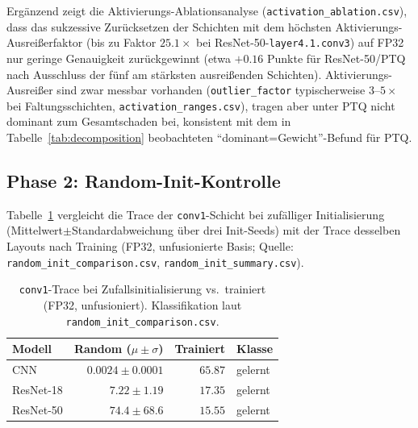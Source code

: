 Ergänzend zeigt die Aktivierungs-Ablationsanalyse (\texttt{activation\_ablation.csv}), dass das sukzessive Zurücksetzen der Schichten mit dem höchsten Aktivierungs-Ausreißerfaktor (bis zu Faktor $25.1\times$ bei ResNet-50-\texttt{layer4.1.conv3}) auf FP32 nur geringe Genauigkeit zurückgewinnt (etwa $+0.16$ Punkte für ResNet-50/PTQ nach Ausschluss der fünf am stärksten ausreißenden Schichten). Aktivierungs-Ausreißer sind zwar messbar vorhanden (\texttt{outlier\_factor} typischerweise $3$--$5\times$ bei Faltungsschichten, \texttt{activation\_ranges.csv}), tragen aber unter PTQ nicht dominant zum Gesamtschaden bei, konsistent mit dem in Tabelle~\ref{tab:decomposition} beobachteten \enquote{dominant=Gewicht}-Befund für PTQ.

\subsection{Phase 2: Random-Init-Kontrolle}
\label{sec:phase2}

Tabelle~\ref{tab:randominit} vergleicht die Trace der \texttt{conv1}-Schicht bei zufälliger Initialisierung (Mittelwert$\pm$Standardabweichung über drei Init-Seeds) mit der Trace desselben Layouts nach Training (FP32, unfusionierte Basis; Quelle: \texttt{random\_init\_comparison.csv}, \texttt{random\_init\_summary.csv}).

\begin{table}[t]
\centering
\small
\caption{\texttt{conv1}-Trace bei Zufallsinitialisierung vs.\ trainiert (FP32, unfusioniert). Klassifikation laut \texttt{random\_init\_comparison.csv}.}
\label{tab:randominit}
\begin{tabular}{lrrl}
\toprule
Modell & Random ($\mu\pm\sigma$) & Trainiert & Klasse \\
\midrule
CNN & $0.0024\pm0.0001$ & $65.87$ & gelernt \\
ResNet-18 & $7.22\pm1.19$ & $17.35$ & gelernt \\
ResNet-50 & $74.4\pm68.6$ & $15.55$ & gelernt \\
\bottomrule
\end{tabular}
\end{table}


